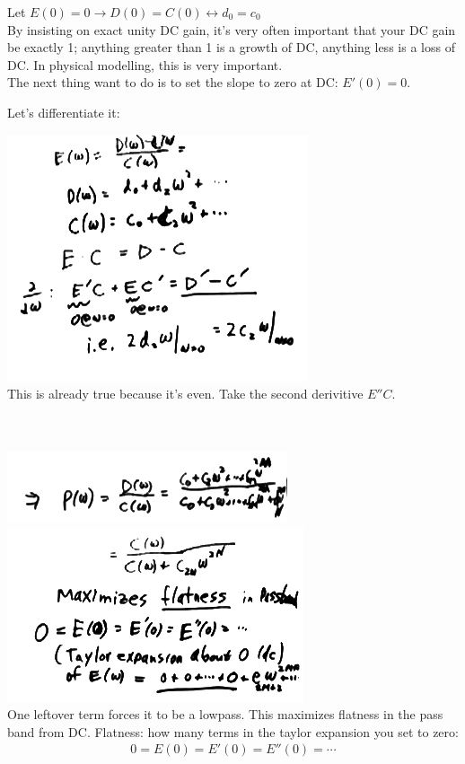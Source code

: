 Let $E(0) = 0 \rightarrow D(0) = C(0) \leftrightarrow d_0 = c_0$ \\

By insisting on exact unity DC gain, it's very often important that your
DC gain be exactly 1; anything greater than 1 is a growth of DC, anything less
is a loss of DC. In physical modelling, this is very important.\\

The next thing want to do is to set the slope to zero at DC: $E'(0) = 0$.

Let's differentiate it:

\includegraphics[scale=0.5]{frames/14e}\\

This is already true because it's even. Take the second derivitive $E''C$.

 \\
\\
\includegraphics[scale=0.5]{frames/14f}\\
\includegraphics[scale=0.5]{frames/14g}\\

One leftover term forces it to be a lowpass. This maximizes flatness in
the pass band from DC. Flatness: how many terms in the taylor expansion you set to zero:
\begin{align*}
    0 = E(0) = E'(0) = E''(0) = \cdots 
\end{align*}


